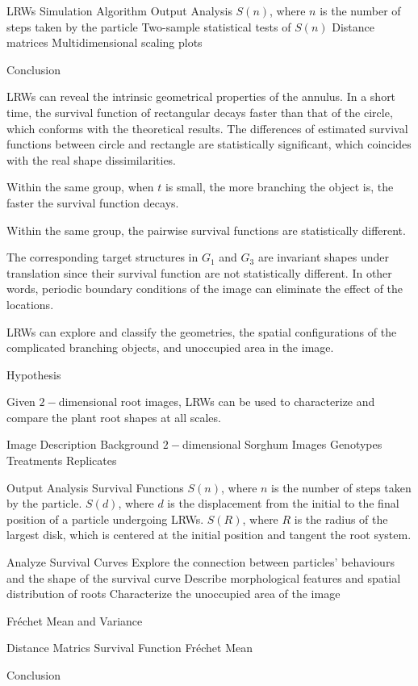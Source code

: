 \documentclass{article}
\begin{document}
\begin{outline}[enumerate]
  \1 LRWs Simulation
    \2 Algorithm
    \2 Output Analysis
      \3 $S(n)$, where $n$ is the number of steps taken by the particle
      \3 Two-sample statistical tests of $S(n)$
      \3 Distance matrices
      \3 Multidimensional scaling plots
      

  \1 Conclusion
  
    \2 LRWs can reveal the intrinsic geometrical properties of the annulus.
    \2 In a short time, the survival function of rectangular decays faster than that of the circle, which conforms with the theoretical results.
    \2 The differences of estimated survival functions between circle and rectangle are statistically significant, which coincides with the real shape dissimilarities.

    \2 Within the same group, when $t$ is small, the more branching the object is, the faster the survival function decays.

    \2 Within the same group, the pairwise survival functions are statistically different.

    \2 The corresponding target structures in $G_1$ and $G_3$ are invariant shapes under translation since their survival function are not statistically different. In other words, periodic boundary conditions of the image can eliminate the effect of the locations.

    \2 LRWs can explore and classify the geometries, the spatial configurations of the complicated branching objects, and unoccupied area in the image.


  \newpage


  \1 Hypothesis
   \par
   Given $2-$dimensional root images, LRWs can be used to characterize and compare the plant root shapes at all scales.
  
  \1 Image Description
     \2 Background
     \2 $2-$dimensional Sorghum Images
       \3 Genotypes
       \3 Treatments
       \3 Replicates
    
  \1 Output Analysis
     \2 Survival Functions
      \3 $S(n)$, where $n$ is the number of steps taken by the particle.
      \3 $S(d)$, where $d$ is the displacement from the initial to the final position of a particle undergoing LRWs.
      \3 $S(R)$, where $R$ is the radius of the largest disk, which is centered at the initial position and tangent the root system.
      
    \2 Analyze Survival Curves
      \3 Explore the connection between particles' behaviours and the shape of the survival curve
      \3 Describe morphological features and spatial distribution of roots
      \3 Characterize the unoccupied area of the image

      
    \2 Fr\'echet Mean and Variance

    
    \2 Distance Matrics
     \3 Survival Function
     \3 Fr\'echet Mean
     
  \1 Conclusion
  
\end{outline}

\newpage

\printbibliography
\end{document}
